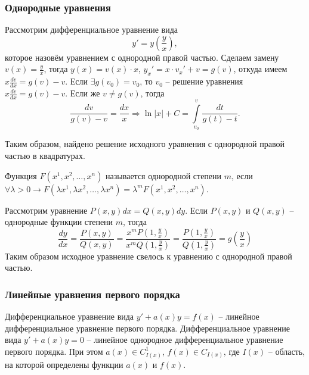 \subsubsection{Однородные уравнения}

Рассмотрим дифференциальное уравнение вида
\[ y' = y \left( \frac{y}{x} \right), \]
которое назовём уравнением с однородной правой частью. Сделаем замену $v(x) = \frac{y}{x}$, тогда $y(x) = v(x) \cdot x$, $y_x' = x \cdot v_x' + v = g(v)$, откуда имеем $x \frac{dv}{dx} = g(v) - v$. Если $\exists g(v_0) = v_0$, то $v_0$ -- решение уравнения $x \frac{dv}{dx} = g(v) - v$. Если же $v \neq g(v)$, тогда
\begin{equation}
    \frac{dv}{g(v) - v} = \frac{dx}{x} \Rightarrow \ln |x| + C = \int\limits_{v_0}^{v} \frac{dt}{g(t) - t}.
\end{equation}

Таким образом, найдено решение исходного уравнения с однородной правой частью в квадратурах.

\begin{definition}
    Функция $F(x^1, x^2, \dots, x^n)$ называется однородной степени $m$, если $\forall \lambda > 0 \longrightarrow F(\lambda x^1, \lambda x^2, \dots,  \lambda x^n) = \lambda^m F(x^1, x^2, \dots, x^n)$.
\end{definition}

\begin{example}
    Рассмотрим уравнение $P(x, y) dx = Q(x, y) dy$. Если $P(x, y)$ и $Q(x, y)$ -- однородные функции степени $m$, тогда
    \begin{equation}
        \frac{dy}{dx} = \frac{P(x, y)}{Q(x, y)} = \frac{x^m P(1, \frac{y}{x})}{x^m Q(1, \frac{y}{x})} = \frac{P(1, \frac{y}{x})}{Q(1, \frac{y}{x})} = g \left( \frac{y}{x} \right)
    \end{equation}
    Таким образом исходное уравнение свелось к уравнению с однородной правой частью.
\end{example}

\subsubsection{Линейные уравнения первого порядка}

\begin{definition}
    Дифференциальное уравнение вида $y' + a(x) y = f(x)$ -- линейное дифференциальное уравнение первого порядка. Дифференциальное уравнение вида $y' + a(x) y = 0$ -- линейное однородное дифференциальное уравнение первого порядка. При этом $a(x) \in C_{I(x)}^1$, $f(x) \in C_{I(x)}$, где $I(x)$ -- область, на которой определены функции $a(x)$ и $f(x)$. 
\end{definition}

